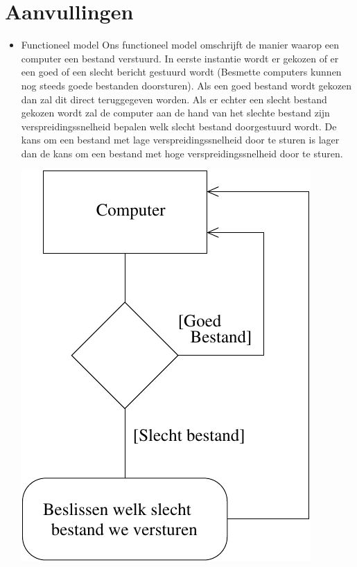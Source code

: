 \documentclass[a4paper,oneside]{report}
\begin{document}
\newpage
\section{Aanvullingen}
\begin{itemize}
\item Functioneel model
Ons functioneel model omschrijft de manier waarop een computer een bestand verstuurd. In eerste instantie wordt er gekozen of 
er een goed of een slecht bericht gestuurd wordt (Besmette computers kunnen nog steeds goede bestanden doorsturen). Als een goed
bestand wordt gekozen dan zal dit direct teruggegeven worden. Als er echter een slecht bestand gekozen wordt zal de computer aan de 
hand van het slechte bestand zijn verspreidingssnelheid bepalen welk slecht bestand doorgestuurd wordt. De kans om een bestand met 
lage verspreidingssnelheid door te sturen is lager dan de kans om een bestand met hoge verspreidingssnelheid door te sturen.

\includegraphics{funcmodel}
\end{itemize}
\end{document}

